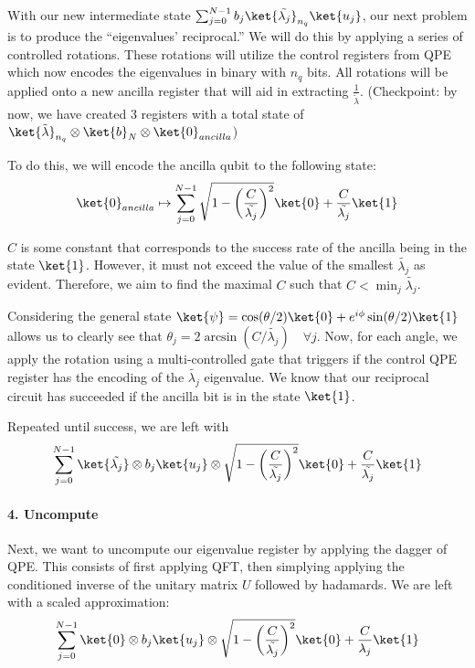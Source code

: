 \documentclass[11pt]{article}
\begin{document}
With our new intermediate state
\(\sum_{j=0}^{N-1}b_{j}\ket{\tilde{\lambda_j}}_{n_q}\ket{u_j}\), our
next problem is to produce the ``eigenvalues' reciprocal.'' We will do
this by applying a series of controlled rotations. These rotations will
utilize the control registers from QPE which now encodes the eigenvalues
in binary with \(n_q\) bits. All rotations will be applied onto a new
ancilla register that will aid in extracting
\(\frac{1}{\tilde{\lambda}}\). (Checkpoint: by now, we have created 3
registers with a total state of
\(\ket{\tilde{\lambda}}_{n_q} \otimes \ket{b}_N \otimes \ket{0}_{ancilla}\))

To do this, we will encode the ancilla qubit to the following state:
\[\ket{0}_{ancilla} \mapsto \sum_{j=0}^{N-1} \sqrt{1 - \left(\frac{C}{\tilde{\lambda_j}}\right)^2}\ket{0}+\frac{C}{\tilde{\lambda_j}}\ket{1}\]

\(C\) is some constant that corresponds to the success rate of the
ancilla being in the state \(\ket{1}\). However, it must not exceed the
value of the smallest \(\tilde{\lambda_j}\) as evident. Therefore, we
aim to find the maximal \(C\) such that
\(C < \min_{j}\tilde{\lambda_j}\).

Considering the general state
\(\ket{\psi} = \cos(\theta/2)\ket{0} + e^{i\phi}\sin(\theta/2)\ket{1}\)
allows us to clearly see that
\(\theta_j = 2\arcsin(C/\tilde{\lambda_j}) \quad \forall j\). Now, for
each angle, we apply the rotation using a multi-controlled gate that
triggers if the control QPE register has the encoding of the
\(\tilde{\lambda_j}\) eigenvalue. We know that our reciprocal circuit
has succeeded if the ancilla bit is in the state \(\ket{1}\).

Repeated until success, we are left with
\[\sum_{j=0}^{N-1}\ket{\tilde{\lambda_j}}\otimes b_{j}\ket{u_j} \otimes \sqrt{1 - \left(\frac{C}{\tilde{\lambda_j}}\right)^2}\ket{0}+\frac{C}{\tilde{\lambda_j}}\ket{1}\]

\paragraph{\texorpdfstring{\textbf{4.
Uncompute}}{4. Uncompute}}\label{uncompute}

Next, we want to uncompute our eigenvalue register by applying the
dagger of QPE. This consists of first applying QFT, then simplying
applying the conditioned inverse of the unitary matrix \(U\) followed by
hadamards. We are left with a scaled approximation:
\[\sum_{j=0}^{N-1}\ket{0}\otimes b_{j}\ket{u_j} \otimes \sqrt{1 - \left(\frac{C}{\tilde{\lambda_j}}\right)^2}\ket{0}+\frac{C}{\lambda_j}\ket{1}\]
\end{document}
